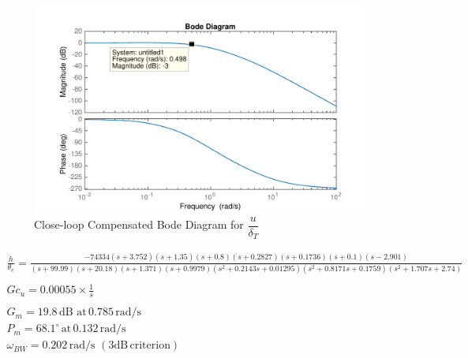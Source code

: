 \documentclass[11pt]{article}
\begin{document}
\begin{figure}[h!]
\begin{center}
\includegraphics[height=.4\textheight]{figures/close_comp_u}
\caption{Close-loop Compensated Bode Diagram for $\dfrac{u}{\delta_T}$}
\end{center}
\end{figure}

\begin{gather*}
\frac{\dot{h}}{\theta_e}=\frac{-74334 (s+3.752) (s+1.35) (s+0.8) (s+0.2827) (s+0.1736) (s+0.1) (s-2.901)}{(s+99.99) (s+20.18) (s+1.371) (s+0.9979) (s^2 + 0.2143s + 0.01295) (s^2 + 0.8171s + 0.1759) (s^2 + 1.707s + 2.74)} \\
\\
\boxed{Gc_{u} = 0.00055 \times \frac{1}{s}} \\
\\
G_m=19.8\,\mathrm{dB\,\, at\,} 0.785 \,\mathrm{rad/s}  \\
P_m=68.1^{\circ}\, \mathrm{at}\, 0.132 \,\mathrm{rad/s} \\
\omega_{BW}=0.202\, \mathrm{rad/s}\,\mathrm{\,(3 dB\, criterion)}\\
\end{gather*}
\end{document}
